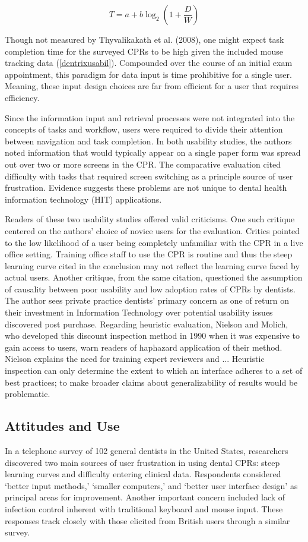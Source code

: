 \documentclass[11pt]{article}
\begin{document}
$$ T = a + b \log_2 \left(1 + \frac{D}{W}\right) $$

\noindent Though not measured by Thyvalikakath et al. (2008), one might expect task completion time for the surveyed CPRs to be high given the included mouse tracking data (\ref{dentrixusabil}). Compounded over the course of an initial exam appointment, this paradigm for data input is time prohibitive for a single user. Meaning, these input design choices are far from efficient for a user that requires efficiency.

Since the information input and retrieval processes were not integrated into the concepts of tasks and workflow, users were required to divide their attention between navigation and task completion. In both usability studies, the authors noted information that would typically appear on a single paper form was spread out over two or more screens in the CPR. The comparative evaluation cited difficulty with tasks that required screen switching as a principle source of user frustration. Evidence suggests these problems are not unique to dental health information technology (HIT) applications\cite{Ash2004Some-unintended,Rose2005Using-qualitati}.

Readers of these two usability studies offered valid criticisms\cite{Cockerell:2009fk}. One such critique centered on the authors' choice of novice users for the evaluation. Critics pointed to the low likelihood of a user being completely unfamiliar with the CPR in a live office setting. Training office staff to use the CPR is routine and thus the steep learning curve cited in the conclusion may not reflect the learning curve faced by actual users. Another critique, from the same citation, questioned the assumption of causality between poor usability and low adoption rates of CPRs by dentists. The author sees private practice dentists' primary concern as one of return on their investment in Information Technology over potential usability issues discovered post purchase. Regarding heuristic evaluation, Nielson and Molich, who developed this discount inspection method in 1990 when it was expensive to gain access to users, warn readers of haphazard application of their method. Nielson explains the need for training expert reviewers and ... Heuristic inspection can only determine the extent to which an interface adheres to a set of best practices; to make broader claims about generalizability of results would be problematic.

\subsection{Attitudes and Use}
In a telephone survey of 102 general dentists in the United States, researchers discovered two main sources of user frustration in using dental CPRs: steep learning curves and difficulty entering clinical data\cite{Schleyer2006Clinical-Comput}. Respondents considered `better input methods,' `smaller computers,' and `better user interface design' as principal areas for improvement. Another important concern included lack of infection control inherent with traditional keyboard and mouse input. These responses track closely with those elicited from British users through a similar survey\cite{John2003Questionnaire-s}.
\end{document}
